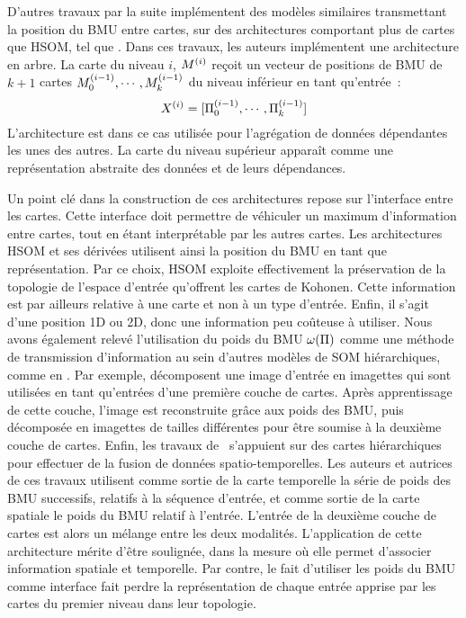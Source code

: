 \documentclass[../main]{subfiles}
\begin{document}
D'autres travaux par la suite implémentent des modèles similaires transmettant la position du BMU entre cartes, sur des architectures comportant plus de cartes que HSOM, tel que \cite{Paplinski2005MultimodalFS,hagenauer_hierarchical_2013}.
Dans ces travaux, les auteurs implémentent une architecture en arbre. La carte du niveau $i$, $M^{({i})}$ reçoit un vecteur de positions de BMU de $k+1$ cartes $M_0^{({i-1})}, \cdots, M_k^{({i-1})}$  du niveau inférieur en tant qu'entrée~:
$$ X^{({i})} = [\Pi_0^{({i-1})}, \cdots, \Pi_k^{({i-1})}]$$
L'architecture est dans ce cas utilisée pour l'agrégation de données dépendantes les unes des autres.
La carte du niveau supérieur apparaît comme une représentation abstraite des données et de leurs dépendances.

Un point clé dans la construction de ces architectures repose sur l'interface entre les cartes. 
Cette interface doit permettre de véhiculer un maximum d'information entre cartes, tout en étant interprétable par les autres cartes.
Les architectures HSOM et ses dérivées utilisent ainsi la position du BMU en tant que représentation.
Par ce choix, HSOM exploite effectivement la préservation de la topologie de l'espace d'entrée qu'offrent les cartes de Kohonen.
Cette information est par ailleurs relative à une carte et non à un type d'entrée. Enfin, il s'agit d'une position 1D ou 2D, donc une information peu coûteuse à utiliser.
Nous avons également relevé l'utilisation du poids du BMU $\omega(\Pi)$ comme une méthode de transmission d'information au sein d'autres modèles de SOM hiérarchiques, comme en \cite{wang_comparisonal_2007, gunes_kayacik_hierarchical_2007, dozono_convolutional_2016}.
Par exemple, \cite{dozono_convolutional_2016} décomposent une image d'entrée en imagettes qui sont utilisées en tant qu'entrées d'une première couche de cartes. 
Après apprentissage de cette couche, l'image est reconstruite grâce aux poids des BMU, puis décomposée en imagettes de tailles différentes pour être soumise à la deuxième couche de cartes.
Enfin, les travaux de~\cite{mici_self-organizing_2018} s'appuient sur des cartes hiérarchiques pour effectuer de la fusion de données spatio-temporelles.
Les auteurs et autrices de ces travaux utilisent comme sortie de la carte temporelle la série de poids des BMU successifs, relatifs à la séquence d'entrée, et comme sortie de la carte spatiale le poids du BMU relatif à l'entrée. L'entrée de la deuxième couche de cartes est alors un mélange entre les deux modalités. 
L'application de cette architecture mérite d'être soulignée, dans la mesure où elle permet d'associer information spatiale et temporelle. Par contre, le fait d'utiliser les poids du BMU comme interface fait perdre la représentation de chaque entrée apprise par les cartes du premier niveau dans leur topologie.
\end{document}
